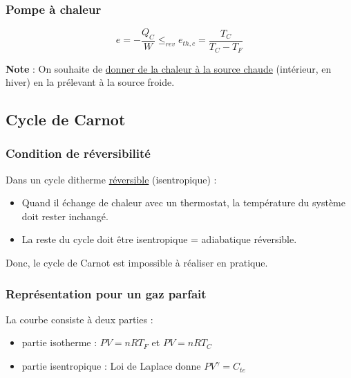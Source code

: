 \subsubsection{Pompe à chaleur} %
\label{sec:Pompe à chaleur}

\begin{equation}
  e = -\frac{Q_C}{W}  \le _{rev} e _{th,c} = \frac{T_C}{T_C - T_F}  
\end{equation}

\begin{tcolorbox}
    \textbf{Note} : On souhaite de \underline{donner de la chaleur à la source chaude} (intérieur, en hiver) en la prélevant à la source froide.
\end{tcolorbox}

\subsection{Cycle de Carnot} %
\label{sub:Cycle de Carnot}

\subsubsection{Condition de réversibilité} %
\label{sec:Condition de réversibilité}

Dans un cycle ditherme \underline{réversible} (isentropique) : 
\begin{itemize}

    \item Quand il échange de chaleur avec un thermostat, la température du système doit rester inchangé. 

    \item La reste du cycle doit être isentropique = adiabatique réversible.

\end{itemize}

Donc, le cycle de Carnot est impossible à réaliser en pratique.

\subsubsection{Représentation pour un gaz parfait} %
\label{sec:Représentation pour un gaz parfait}

La courbe consiste à deux parties : 
\begin{itemize}

    \item partie isotherme : $PV = nRT_F$ et $PV = nRT_C$ 
    \item partie isentropique : Loi de Laplace donne $PV ^{\gamma} = C _{te}$

\end{itemize}

